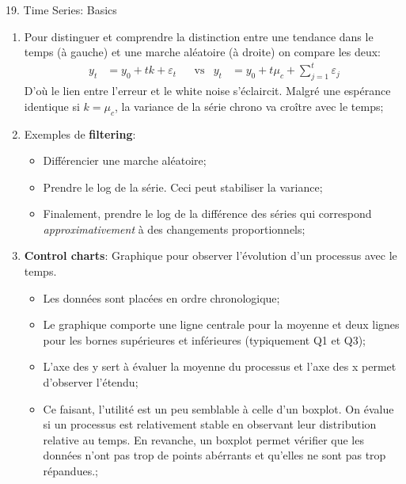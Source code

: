 \documentclass[12pt, titlepage, french]{report}
\begin{document}
\begin{CHPT_SUMM}{19. Time Series: Basics}
\begin{enumerate}
	\begin{itemize}
		\item	Habituellement, $\text{E}[c_{t}] = \mu_{c} = 0$ mais l'auteur le défini plus généralement;
		\item	Si $\mu_{c} = 0$ la série est néanmoins non-stationnaire puisque la variance croît avec le temps;
		\item	Si $\mu_{c} \neq 0$ la série est une marche aléatoire \textbf{avec drift} où $\mu_{c}$ est le drift;
		\item	On déduit de plus que la différence entre marches aléatoires $y_{t} - y_{t - 1}$ est du white noise;
	\end{itemize}
	\item[]	Pour distinguer et comprendre la distinction entre une tendance dans le temps (à gauche) et une marche aléatoire (à droite) on compare les deux:
	\begin{align*}
		y_{t}	&= 	y_{0} + t k + \varepsilon_{t}	&
		&\text{vs}	&
		y_{t}	&= 	y_{0} + t \mu_{c}  + \sum_{j = 1}^{t} \varepsilon_{j}	
	\end{align*}
	D'où le lien entre l'erreur et le white noise s'éclaircit. Malgré une espérance identique si $k = \mu_{c}$, la variance de la série chrono va croître avec le temps;
	\item[]	\label{sec:ex_rand_walk} Exemples de \textbf{filtering}: 
	\begin{itemize}
		\item	Différencier une marche aléatoire;
		\item	Prendre le log de la série. Ceci peut stabiliser la variance;
		\item	Finalement, prendre le log de la différence des séries qui correspond \textit{approximativement} à des changements proportionnels;
	\end{itemize}
	\item	\textbf{Control charts}: Graphique pour observer l'évolution d'un processus avec le temps.
	\begin{itemize}
		\item	Les données sont placées en ordre chronologique;
		\item	Le graphique comporte une ligne centrale pour la moyenne et deux lignes pour les bornes supérieures et inférieures (typiquement Q1 et Q3);
		\item	L'axe des y sert à évaluer la moyenne du processus et l'axe des x permet d'observer l'étendu;
		\item	Ce faisant, l'utilité est un peu semblable à celle d'un boxplot. On évalue si un processus est relativement stable en observant leur distribution relative au temps. En revanche, un boxplot permet vérifier que les données n'ont pas trop de points abérrants et qu’elles ne sont pas trop répandues.;

\end{itemize}
\end{enumerate}
\end{CHPT_SUMM}
\end{document}
